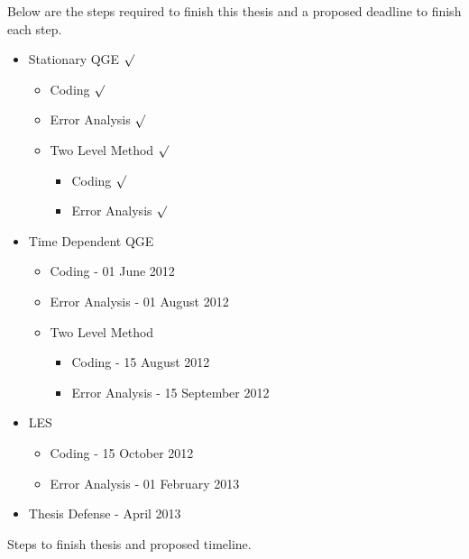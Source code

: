 Below are the steps required to finish this thesis and a proposed deadline to finish each step.
\begin{table}[H]
  \begin{itemize}
    \item Stationary QGE $\surd$
      \begin{itemize}
        \item Coding $\surd$
        \item Error Analysis $\surd$
        \item Two Level Method $\surd$
        \begin{itemize}
          \item Coding $\surd$
          \item Error Analysis $\surd$
        \end{itemize}
      \end{itemize}
    \item Time Dependent QGE
      \begin{itemize}
        \item Coding - 01 June 2012
        \item Error Analysis - 01 August 2012
        \item Two Level Method
        \begin{itemize}
          \item Coding - 15 August 2012
          \item Error Analysis - 15 September 2012
        \end{itemize}
      \end{itemize}
    \item LES
      \begin{itemize}
        \item Coding - 15 October 2012
        \item Error Analysis - 01 February 2013
      \end{itemize}
    \item Thesis Defense - April 2013
  \end{itemize}
  \caption{Steps to finish thesis and proposed timeline.}
  \label{tab:Timeline}
\end{table}
